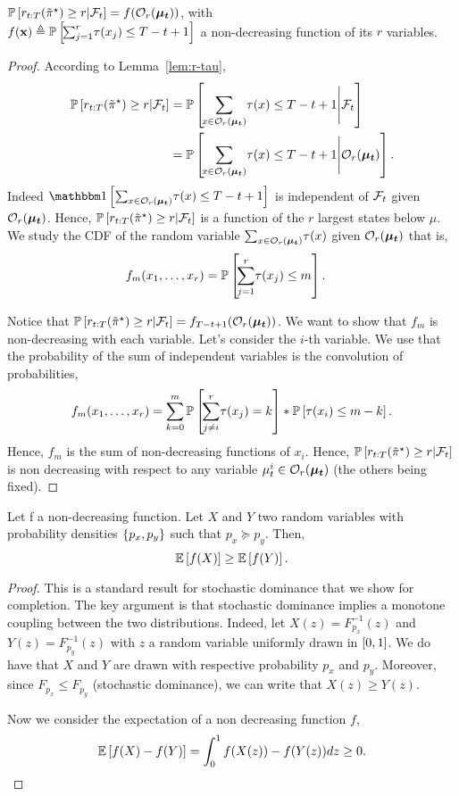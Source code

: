 \begin{corollary}
\label{cor:f-non-decreasing}
$\mathbb{P}\left[r_{t:T}(\Tilde{\pi}^\star) \geq r| \mathcal{F}_t\right] = f(\mathcal{O}_r(\boldsymbol{\mu_t}))$, with \\$f({\bf x}) \triangleq \mathbb{P}\left[\!\sum_{j=1}^r \!\tau(x_j) \leq T-t+1\right]$ a non-decreasing function of its $r$ variables. 
\end{corollary}
\begin{proof}
According to Lemma~\ref{lem:r-tau},
  \begin{align*}
 \mathbb{P}\left[r_{t:T}(\Tilde{\pi}^\star) \geq r| \mathcal{F}_t\right] &= \mathbb{P}\left[\!\sum_{x \in \mathcal{O}_r(\boldsymbol{\mu_t})} \!\tau(x) \leq T - t + 1 \Bigg| \mathcal{F}_t\right]\\
 &= \mathbb{P}\left[\!\sum_{x \in \mathcal{O}_r(\boldsymbol{\mu_t})} \!\tau(x) \leq T - t + 1 \Bigg| \mathcal{O}_r(\boldsymbol{\mu_t})\right].
 \end{align*}
Indeed $\ind{\sum_{x \in \Ort} \!\tau(x) \leq T - t + 1}$ is independent of $\mathcal{F}_t$ given $\mathcal{O}_r(\boldsymbol{\mu_t})$. Hence,  $\mathbb{P}\left[r_{t:T}(\Tilde{\pi}^\star) \geq r| \mathcal{F}_t\right] $ is a function of the $r$ largest states below $\mu$. We study the CDF of the random variable $\sum_{x \in \mathcal{O}_r(\boldsymbol{\mu_t})} \!\tau(x)$ given $\mathcal{O}_r(\boldsymbol{\mu_t})$ that is, 
   \begin{align*}
 f_m(x_1, \dots, x_r) &= \mathbb{P}\left[\!\sum_{j=1}^r \!\tau(x_j) \leq m\right].
 \end{align*}
 
Notice that $\mathbb{P}\left[r_{t:T}(\Tilde{\pi}^\star) \geq r| \mathcal{F}_t\right] = f_{T-t+1}(\mathcal{O}_r(\boldsymbol{\mu_t}))$. We want to show that $f_m$ is non-decreasing with each variable. Let's consider the $i$-th variable. We use that the probability of the sum of independent variables is the convolution of probabilities,
  \[
  f_m(x_1, \dots, x_r)  = \sum_{k=0}^m \mathbb{P}\left[\!\sum_{j\neq i}^r \!\tau(x_j) =k  \right] * \mathbb{P}\left[\tau(x_i) \leq m-k\right].
  \]
Hence, $f_m$ is the sum of non-decreasing functions of $x_i$. Hence, $\mathbb{P}\left[r_{t:T}(\Tilde{\pi}^\star) \geq r| \mathcal{F}_t\right]$ is non decreasing with respect to any variable $\mu_t^i \in \mathcal{O}_r(\boldsymbol{\mu_t})$ (the others being fixed).
\end{proof}
\begin{lemma}
\label{lem:stoch-dom-monotone}
Let f a non-decreasing function. Let $X$ and $Y$ two random variables with probability densities $\left\{p_x, p_y\right\}$ such that $p_x \succeq p_y$. Then, 
\[
\mathbb{E}\left[f(X)\right] \geq \mathbb{E}\left[f(Y)\right].
\]
\end{lemma}
\begin{proof}
This is a standard result for stochastic dominance that we show for completion. The key argument is that stochastic dominance implies a monotone coupling between the two distributions. Indeed, let 
$X(z)= F_{p_x}^{-1}(z)$ and $Y(z)= F_{p_y}^{-1}(z)$ with $z$ a random variable uniformly drawn in $\left[0,1\right]$. We do have that $X$ and $Y$ are drawn with respective probability $p_x$ and $p_y$. Moreover, since $F_{p_x}\leq F_{p_y}$ (stochastic dominance), we can write that $X(z)\geq Y(z)$. 

Now we consider the expectation of a non decreasing function $f$, 
\[ \mathbb{E}\left[f(X) -f(Y)\right] = \int_0^1 f(X(z)) - f(Y(z)) dz \geq 0.\]
\end{proof}

